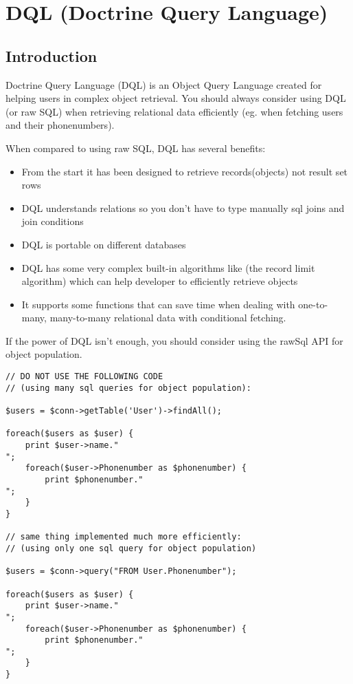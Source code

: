 \documentclass[11pt,a4paper]{report}
\begin{document}
\chapter{DQL (Doctrine Query Language)}
\section{Introduction}
Doctrine Query Language (DQL) is an Object Query Language created for helping users in complex object retrieval. You should always consider using DQL (or raw SQL) when retrieving relational data efficiently (eg. when fetching users and their phonenumbers).

When compared to using raw SQL, DQL has several benefits:

\begin{itemize}
\item{From the start it has been designed to retrieve records(objects) not result set rows}
\item{DQL understands relations so you don't have to type manually sql joins and join conditions}
\item{DQL is portable on different databases}
\item{DQL has some very complex built-in algorithms like (the record limit algorithm) which can help developer to efficiently retrieve objects}
\item{It supports some functions that can save time when dealing with one-to-many, many-to-many relational data with conditional fetching.}
\end{itemize}
If the power of DQL isn't enough, you should consider using the rawSql API for object population.

\begin{verbatim}
// DO NOT USE THE FOLLOWING CODE
// (using many sql queries for object population):

$users = $conn->getTable('User')->findAll();

foreach($users as $user) {
    print $user->name."
";
    foreach($user->Phonenumber as $phonenumber) {
        print $phonenumber."
";
    }
}

// same thing implemented much more efficiently:
// (using only one sql query for object population)

$users = $conn->query("FROM User.Phonenumber");

foreach($users as $user) {
    print $user->name."
";
    foreach($user->Phonenumber as $phonenumber) {
        print $phonenumber."
";
    }
}
\end{verbatim}
\end{document}
